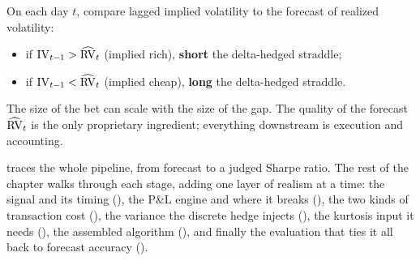 \begin{keyidea}
On each day $t$, compare lagged implied volatility to the forecast of realized volatility:
\begin{itemize}
  \item if $\operatorname{IV}_{t-1} > \widehat{\operatorname{RV}}_t$ (implied rich), \textbf{short} the delta-hedged straddle;
  \item if $\operatorname{IV}_{t-1} < \widehat{\operatorname{RV}}_t$ (implied cheap), \textbf{long} the delta-hedged straddle.
\end{itemize}
The size of the bet can scale with the size of the gap. The quality of the forecast $\widehat{\operatorname{RV}}_t$ is the only proprietary ingredient; everything downstream is execution and accounting.
\end{keyidea}

 traces the whole pipeline, from forecast to a judged Sharpe ratio. The rest of the chapter walks through each stage, adding one layer of realism at a time: the signal and its timing (), the P\&L engine and where it breaks (), the two kinds of transaction cost (), the variance the discrete hedge injects (), the kurtosis input it needs (), the assembled algorithm (), and finally the evaluation that ties it all back to forecast accuracy ().

